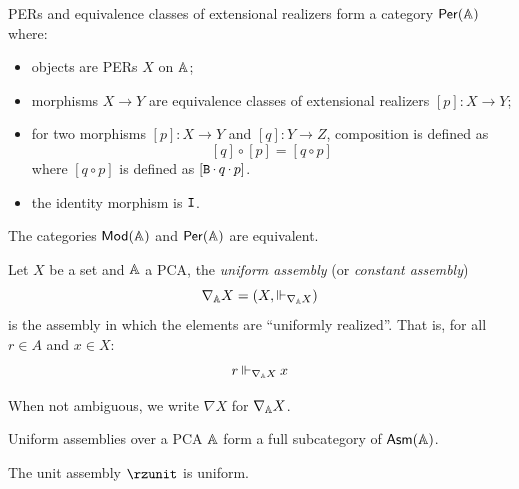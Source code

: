 \begin{definition}
    PERs and equivalence classes of extensional realizers form a category \(\mathsf{Per}(\mathbb{A})\) where:
    \begin{itemize}
        \item objects are PERs \(X\) on \(\mathbb{A}\);
        \item morphisms \(X \rightarrow Y\) are equivalence classes of extensional realizers \([p] : X \rightarrow Y\);
        \item for two morphisms \([p] : X \rightarrow Y\) and \([q] : Y \rightarrow Z\), composition is defined as
        \[
          [q] \circ [p] = [q \circ p]
        \]
        where \([q \circ p]\) is defined as \([\mathtt{B} \mathop\cdot\nolimits q \mathop\cdot\nolimits p]\).
        \item the identity morphism is \(\mathtt{I}\).
    \end{itemize}
\end{definition}

\begin{proposition}
    The categories \(\mathsf{Mod}(\mathbb{A})\) and \(\mathsf{Per}(\mathbb{A})\) are equivalent.
\end{proposition}

\begin{definition}
    Let \(X\) be a set and \(\mathbb{A}\) a PCA, the \emph{uniform assembly} (or \emph{constant assembly})
    \[
        \nabla_{\mathbb{A}}X = (X, \mathbin\Vdash_{\nabla_{\mathbb{A}} X})
    \]
    is the assembly in which the elements are ``uniformly realized''.  That is, for all \(r \in A\) and \(x \in X\):
    \[
        r \mathbin\Vdash_{\nabla_{\mathbb{A}} X} x
    \]
\end{definition}

\begin{notation}
    When not ambiguous, we write \(\nabla X\) for \(\nabla_{\mathbb{A}} X\).
\end{notation}

\begin{fact}
    Uniform assemblies over a PCA \(\mathbb{A}\) form a full subcategory of \(\mathsf{Asm}(\mathbb{A})\).
\end{fact}

\begin{proposition}
    The unit assembly \(\rzunit\) is uniform.
\end{proposition}


